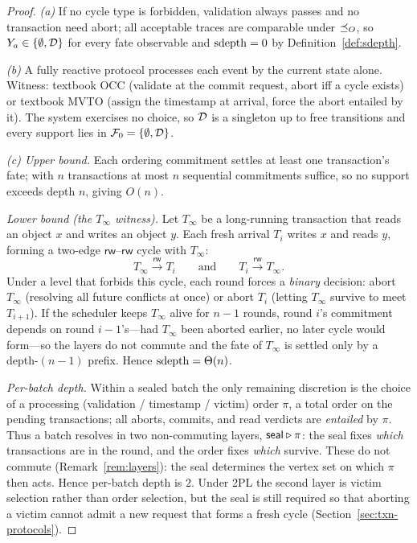 \begin{proof}
  \emph{(a)} If no cycle type is forbidden, validation always passes and no
  transaction need abort; all acceptable traces are comparable under $\preceq_O$,
  so $Y_a \in \{\emptyset, \mathcal{D}\}$ for every fate observable and
  $\operatorname{sdepth} = 0$ by Definition~\ref{def:sdepth}.

  \emph{(b)} A fully reactive protocol processes each event by the current
  state alone. Witness: textbook OCC (validate at the commit request, abort iff
  a cycle exists) or textbook MVTO (assign the timestamp at arrival, force the
  abort entailed by it). The system exercises no choice, so $\mathcal{D}$ is a
  singleton up to free transitions and every support lies in
  $\mathcal F_0 = \{\emptyset,\mathcal{D}\}$.

  \emph{(c) Upper bound.} Each ordering commitment settles at least one
  transaction's fate; with $n$ transactions at most $n$ sequential commitments
  suffice, so no support exceeds depth $n$, giving $O(n)$.

  \emph{Lower bound (the $T_\infty$ witness).} Let $T_\infty$ be a long-running
  transaction that reads an object $x$ and writes an object $y$. Each fresh
  arrival $T_i$ writes $x$ and reads $y$, forming a two-edge $\mathsf{rw}$--$\mathsf{rw}$
  cycle with $T_\infty$:
  \[
    T_\infty \xrightarrow{\mathsf{rw}} T_i
    \qquad\text{and}\qquad
    T_i \xrightarrow{\mathsf{rw}} T_\infty .
  \]
  Under a level that forbids this cycle, each round forces a \emph{binary}
  decision: abort $T_\infty$ (resolving all future conflicts at once) or abort
  $T_i$ (letting $T_\infty$ survive to meet $T_{i+1}$). If the scheduler keeps
  $T_\infty$ alive for $n{-}1$ rounds, round $i$'s commitment depends on round
  $i{-}1$'s---had $T_\infty$ been aborted earlier, no later cycle would
  form---so the layers do not commute and the fate of $T_\infty$ is settled only
  by a depth-$(n{-}1)$ prefix. Hence $\operatorname{sdepth} = \Theta(n)$.

  \emph{Per-batch depth.} Within a sealed batch the only remaining discretion is
  the choice of a processing (validation / timestamp / victim) order $\pi$, a
  total order on the pending transactions; all aborts, commits, and read
  verdicts are \emph{entailed} by $\pi$. Thus a batch resolves in two
  non-commuting layers, $\mathsf{seal} \mathbin{\triangleright} \pi$: the seal fixes \emph{which}
  transactions are in the round, and the order fixes \emph{which} survive. These
  do not commute (Remark~\ref{rem:layers}): the seal determines the vertex set
  on which $\pi$ then acts. Hence per-batch depth is $2$. Under 2PL the second
  layer is victim selection rather than order selection, but the seal is still
  required so that aborting a victim cannot admit a new request that forms a
  fresh cycle (Section~\ref{sec:txn-protocols}).
\end{proof}

